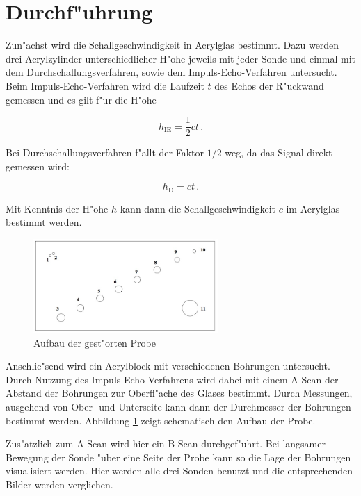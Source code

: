 \section{Durchf"uhrung}
\label{sec:durchfuehrung}
	Zun"achst wird die Schallgeschwindigkeit in Acrylglas bestimmt.
	Dazu werden drei Acrylzylinder unterschiedlicher H"ohe jeweils mit jeder Sonde und einmal mit dem Durchschallungsverfahren, sowie dem Impuls-Echo-Verfahren untersucht.
	Beim Impuls-Echo-Verfahren wird die Laufzeit $t$ des Echos der R"uckwand gemessen und es gilt f"ur die H"ohe

	\begin{equation}
		h_\mathrm{IE} = \frac{1}{2}c t \,. \label{s1}
	\end{equation}

	Bei Durchschallungsverfahren f"allt der Faktor $1/2$ weg, da das Signal direkt gemessen wird:

	\begin{equation}
		h_\mathrm{D} = c t \,.
	\end{equation}

	Mit Kenntnis der H"ohe $h$ kann dann die Schallgeschwindigkeit $c$ im Acrylglas bestimmt werden. \\

	\begin{figure}
		\centering
		\includegraphics[width = 7cm]{img/klotz.jpeg}
		\caption{Aufbau der gest"orten Probe \cite{anleitung} \label{fig:klotz}}
	\end{figure}

	Anschlie"send wird ein Acrylblock mit verschiedenen Bohrungen untersucht.
	Durch Nutzung des Impuls-Echo-Verfahrens wird dabei mit einem A-Scan der Abstand der Bohrungen zur Oberfl"ache des Glases bestimmt.
	Durch Messungen, ausgehend von Ober- und Unterseite kann dann der Durchmesser der Bohrungen bestimmt werden.
	Abbildung \ref{fig:klotz} zeigt schematisch den Aufbau der Probe.

	Zus"atzlich zum A-Scan wird hier ein B-Scan durchgef"uhrt.
	Bei langsamer Bewegung der Sonde "uber eine Seite der Probe kann so die Lage der Bohrungen visualisiert werden.
	Hier werden alle drei Sonden benutzt und die entsprechenden Bilder werden verglichen. \\

